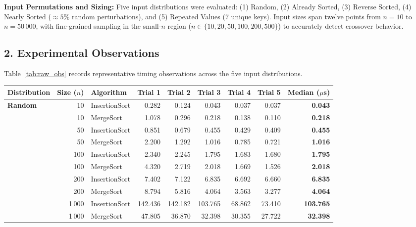 \documentclass[11pt]{article}
\begin{document}
\noindent\textbf{Input Permutations and Sizing:} Five input distributions were evaluated: (1) Random, (2) Already Sorted, (3) Reverse Sorted, (4) Nearly Sorted ($\approx 5\%$ random perturbations), and (5) Repeated Values (7 unique keys). Input sizes span twelve points from $n = 10$ to $n = 50\,000$, with fine-grained sampling in the small-$n$ region ($n \in \{10, 20, 50, 100, 200, 500\}$) to accurately detect crossover behavior.

\newpage
\subsection*{2. Experimental Observations}
Table~\ref{tab:raw_obs} records representative timing observations across the five input distributions.

\begin{center}
\scriptsize
\renewcommand{\arraystretch}{0.92}
\label{tab:raw_obs}
\vspace{-0.5em}
\begin{tabular*}{\textwidth}{@{\extracolsep{\fill}}l r l rrrrr r}
\toprule
\textbf{Distribution} & \textbf{Size ($n$)} & \textbf{Algorithm} & \textbf{Trial 1} & \textbf{Trial 2} & \textbf{Trial 3} & \textbf{Trial 4} & \textbf{Trial 5} & \textbf{Median ($\mu$s)} \\
\midrule
\textbf{Random} & 10 & InsertionSort & 0.282 & 0.124 & 0.043 & 0.037 & 0.037 & \textbf{0.043} \\
& 10 & MergeSort & 1.078 & 0.296 & 0.218 & 0.138 & 0.110 & \textbf{0.218} \\
& 50 & InsertionSort & 0.851 & 0.679 & 0.455 & 0.429 & 0.409 & \textbf{0.455} \\
& 50 & MergeSort & 2.200 & 1.292 & 1.016 & 0.785 & 0.721 & \textbf{1.016} \\
& 100 & InsertionSort & 2.340 & 2.245 & 1.795 & 1.683 & 1.680 & \textbf{1.795} \\
& 100 & MergeSort & 4.320 & 2.719 & 2.018 & 1.669 & 1.526 & \textbf{2.018} \\
& 200 & InsertionSort & 7.402 & 7.122 & 6.835 & 6.692 & 6.660 & \textbf{6.835} \\
& 200 & MergeSort & 8.794 & 5.816 & 4.064 & 3.563 & 3.277 & \textbf{4.064} \\
& 1\,000 & InsertionSort & 142.436 & 142.182 & 103.765 & 68.862 & 73.410 & \textbf{103.765} \\
& 1\,000 & MergeSort & 47.805 & 36.870 & 32.398 & 30.355 & 27.722 & \textbf{32.398} \\

\end{tabular*}
\end{center}
\end{document}
